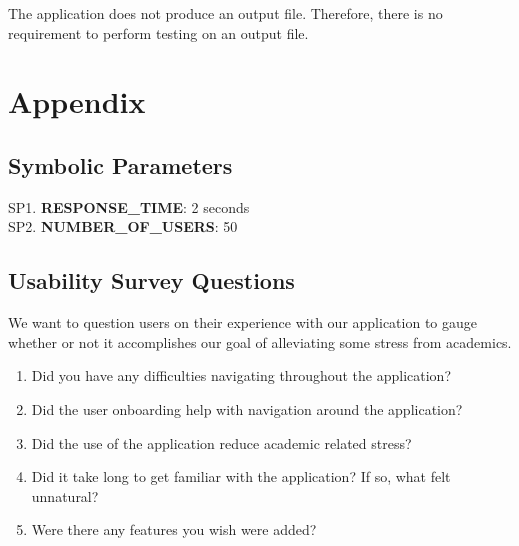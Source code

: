 \documentclass[12pt, titlepage]{article}
\begin{document}
The application does not produce an output file. Therefore, there is no requirement to perform testing on an output file.

\section{Appendix}

\subsection{Symbolic Parameters}

SP1. \textbf{RESPONSE\_TIME}: 2 seconds\\
SP2. \textbf{NUMBER\_OF\_USERS}: 50

\subsection{Usability Survey Questions}

We want to question users on their experience with our application to gauge whether or not it accomplishes our goal of alleviating some stress from academics. \\

\begin{enumerate}
\item{Did you have any difficulties navigating throughout the application?}
\item{Did the user onboarding help with navigation around the application?}
\item{Did the use of the application reduce academic related stress?}
\item{Did it take long to get familiar with the application? If so, what felt unnatural?}
\item{Were there any features you wish were added?}
\end{enumerate}
\end{document}
